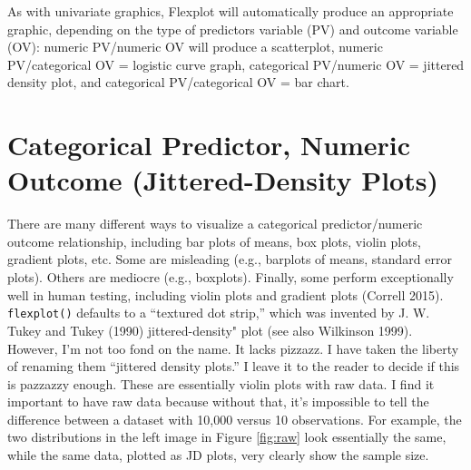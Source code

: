 \documentclass[,]{book}
\begin{document}
As with univariate graphics, Flexplot will automatically produce an
appropriate graphic, depending on the type of predictors variable (PV)
and outcome variable (OV): numeric PV/numeric OV will produce a
scatterplot, numeric PV/categorical OV = logistic curve graph,
categorical PV/numeric OV = jittered density plot, and categorical
PV/categorical OV = bar chart.

\section*{Categorical Predictor, Numeric Outcome (Jittered-Density
Plots)}\label{categorical-predictor-numeric-outcome-jittered-density-plots}

There are many different ways to visualize a categorical
predictor/numeric outcome relationship, including bar plots of means,
box plots, violin plots, gradient plots, etc. Some are misleading (e.g.,
barplots of means, standard error plots). Others are mediocre (e.g.,
boxplots). Finally, some perform exceptionally well in human testing,
including violin plots and gradient plots (Correll 2015).
\texttt{flexplot()} defaults to a ``textured dot strip,'' which was
invented by J. W. Tukey and Tukey (1990) jittered-density" plot (see
also Wilkinson 1999). However, I'm not too fond on the name. It lacks
pizzazz. I have taken the liberty of renaming them ``jittered density
plots.'' I leave it to the reader to decide if this is pazzazzy enough.
These are essentially violin plots with raw data. I find it important to
have raw data because without that, it's impossible to tell the
difference between a dataset with 10,000 versus 10 observations. For
example, the two distributions in the left image in Figure \ref{fig:raw}
look essentially the same, while the same data, plotted as JD plots,
very clearly show the sample size.
\end{document}
